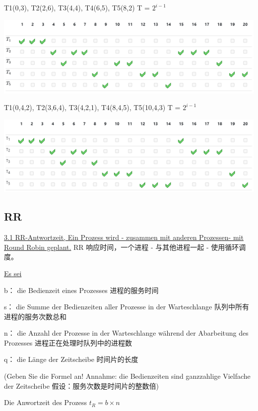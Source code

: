 \documentclass[fleqn]{article}
\begin{document}
T1(0,3), T2(2,6), T3(4,4), T4(6,5), T5(8,2)
T = $2^{i-1}$

\begin{center}
    \includegraphics{19.png}
\end{center}

T1(0,4,2), T2(3,6,4), T3(4,2,1), T4(8,4,5), T5(10,4,3) 
T = $2^{i-1}$

\begin{center}
    \includegraphics{20.png}
\end{center}

\subsection{RR}

\noindent\uline{3.1 RR-Antwortzeit, Ein Prozess wird - zusammen mit anderen Prozessen- mit Round Robin geplant.}
RR 响应时间，一个进程 - 与其他进程一起 - 使用循环调度。

\uline{Es sei}

b： die Bedienzeit eines Prozesses 进程的服务时间

s： die Summe der Bedienzeiten aller Prozesse in der Warteschlange 队列中所有进程的服务次数总和

n： die Anzahl der Prozesse in der Warteschlange während der Abarbeitung des Prozesses 进程正在处理时队列中的进程数

q： die Länge der Zeitscheibe 时间片的长度

(Geben Sie die Formel an! Annahme: die Bedienzeiten sind ganzzahlige Vielfache der Zeitscheibe 假设：服务次数是时间片的整数倍)

Die Anwortzeit des Prozess $t_R = b \times n$
\end{document}
